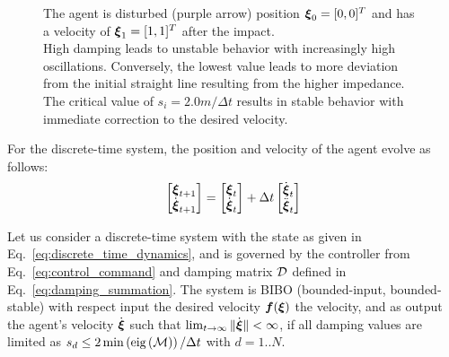 \begin{figure}[htbp]
{ The agent is disturbed (purple arrow) position $\boldsymbol{\xi}_0 = [0, 0]^T$ and has a velocity of  $\boldsymbol{\xi}_1 = [1, 1]^T$ after the impact. \\
  High damping leads to unstable behavior with increasingly high oscillations. Conversely, the lowest value leads to more deviation from the initial straight line resulting from the higher impedance. The critical value of $s_i = 2.0 m / \Delta t$ results in stable behavior with immediate correction to the desired velocity.}
  \label{fig:discrete_controller_parameters_comparison}
\end{figure}

For the discrete-time system, the position and velocity of the agent evolve as follows:
\begin{equation}
	\begin{bmatrix}
	 \vecs \xi_{t+1} \\ \dot{\vecs \xi}_{t+1}
	\end{bmatrix}
	=
	\begin{bmatrix}
	 \vecs \xi_{t} \\ \dot{\vecs \xi}_{t}
	\end{bmatrix}
	+ 
	\Delta t 
	\begin{bmatrix}
		\dot{\vecs \xi}_{t} \\ \ddot{\vecs \xi}_t 
	\end{bmatrix}
	\label{eq:discrete_time_dynamics}
\end{equation}

\begin{lemma}
	Let us consider a discrete-time system with the state as given in Eq.~\eqref{eq:discrete_time_dynamics}, and is governed by the controller from Eq.~\eqref{eq:control_command} and damping matrix $\mathcal{D}$ defined in Eq.~\eqref{eq:damping_summation}.
	The system is BIBO (bounded-input, bounded-stable) with respect input the desired velocity $\boldsymbol{f}(\boldsymbol{\xi})$ the velocity, and as output the agent's velocity $\dot{\boldsymbol{\xi}}$ such that $\lim_{t \rightarrow \infty} \| \dot{\boldsymbol{\xi}} \| < \infty$, if all damping values are limited as $s_{d} \leq 2 \min \left( \text{eig}\left(\mathcal{M}\right)  \right) / \Delta t$ with $d=1.. N$.
\end{lemma}


